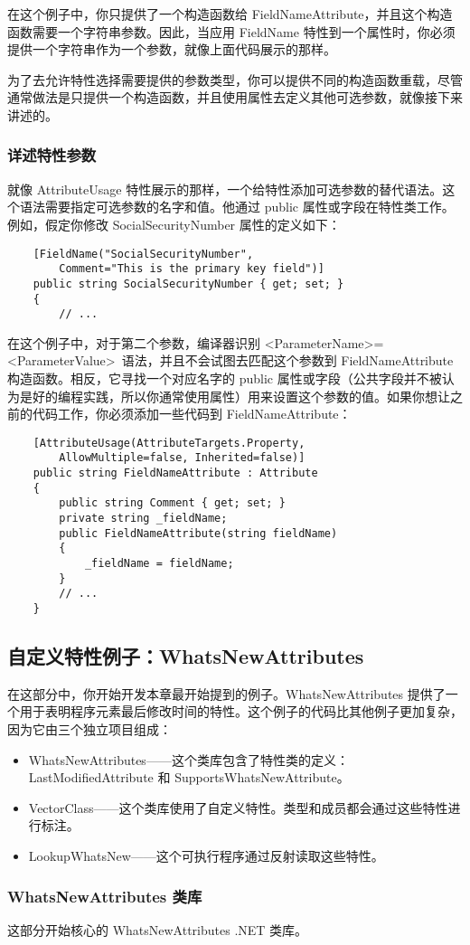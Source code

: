 在这个例子中，你只提供了一个构造函数给 FieldNameAttribute，并且这个构造函数需要一个字符串参数。因此，当应用 FieldName 特性到一个属性时，你必须提供一个字符串作为一个参数，就像上面代码展示的那样。

为了去允许特性选择需要提供的参数类型，你可以提供不同的构造函数重载，尽管通常做法是只提供一个构造函数，并且使用属性去定义其他可选参数，就像接下来讲述的。

\subsubsection{详述特性参数}
就像 AttributeUsage 特性展示的那样，一个给特性添加可选参数的替代语法。这个语法需要指定可选参数的名字和值。他通过 public 属性或字段在特性类工作。例如，假定你修改 SocialSecurityNumber 属性的定义如下：
\begin{verbatim}
    [FieldName("SocialSecurityNumber", 
        Comment="This is the primary key field")]
    public string SocialSecurityNumber { get; set; }
    {
        // ...
\end{verbatim}
在这个例子中，对于第二个参数，编译器识别 \textless ParameterName\textgreater =\textless ParameterValue\textgreater\  语法，并且不会试图去匹配这个参数到 FieldNameAttribute 构造函数。相反，它寻找一个对应名字的 public 属性或字段（公共字段并不被认为是好的编程实践，所以你通常使用属性）用来设置这个参数的值。如果你想让之前的代码工作，你必须添加一些代码到 FieldNameAttribute：
\begin{verbatim}
    [AttributeUsage(AttributeTargets.Property,
        AllowMultiple=false, Inherited=false)]
    public string FieldNameAttribute : Attribute
    {
        public string Comment { get; set; }
        private string _fieldName;
        public FieldNameAttribute(string fieldName)
        {
            _fieldName = fieldName;
        }
        // ...
    }
\end{verbatim}

\subsection{自定义特性例子：WhatsNewAttributes}
在这部分中，你开始开发本章最开始提到的例子。WhatsNewAttributes 提供了一个用于表明程序元素最后修改时间的特性。这个例子的代码比其他例子更加复杂，因为它由三个独立项目组成：
\begin{itemize}
    \item WhatsNewAttributes——这个类库包含了特性类的定义：LastModifiedAttribute 和 SupportsWhatsNewAttribute。
    \item VectorClass——这个类库使用了自定义特性。类型和成员都会通过这些特性进行标注。
    \item LookupWhatsNew——这个可执行程序通过反射读取这些特性。
\end{itemize}

\subsubsection{WhatsNewAttributes 类库}
这部分开始核心的 WhatsNewAttributes .NET 类库。